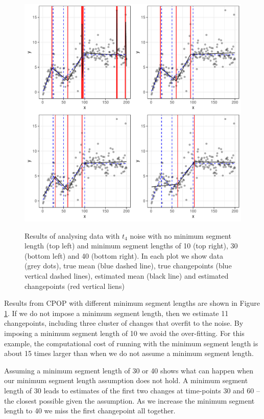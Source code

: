 \documentclass[nojss]{jss}
\begin{document}
\begin{figure}
\centering
{\includegraphics[scale=.5]{figures/cpop_minseg_ggplot.pdf}}
\caption{Results of analysing data with $t_4$ noise with no minimum segment length (top left) and minimum segment lengths of 10 (top right), 30 (bottom left) and 40 (bottom right). In each plot we show data (grey dots), true mean (blue dashed line), true changepoints (blue vertical dashed lines), estimated mean (black line) and estimated changepoints (red vertical liens)}
\label{fig:cpop-minseg}
\end{figure}
%
%
Results from CPOP with different minimum segment lengths are shown in Figure \ref{fig:cpop-minseg}. If we do not impose a minimum segment length, then we estimate 11 changepoints, including three cluster of changes that overfit to the noise. By imposing a minimum segment length of 10 we avoid the over-fitting. For this example, the computational cost of running  with the minimum segment length is about 15 times larger than when we do not assume a minimum segment length.

Assuming a minimum segment length of 30 or 40 shows what can happen when our minimum segment length assumption does not hold. A minimum segment length of 30 leads to estimates of the first two changes at time-points 30 and 60 -- the closest possible given the assumption. As we increase the minimum segment length to 40 we miss the first changepoint all together. 
\end{document}

